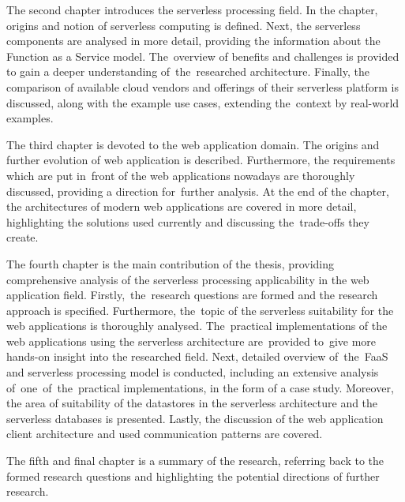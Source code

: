The second chapter introduces the serverless processing field.
In the chapter, origins and notion of serverless computing is defined.
Next, the serverless components are analysed in more detail, providing the information about the Function as a Service model.
The~overview of benefits and challenges is provided to gain a deeper understanding of~the~researched architecture.
Finally, the comparison of available cloud vendors and offerings of their serverless platform is discussed, along with the example use cases, extending the~context by real-world examples.

The third chapter is devoted to the web application domain. The origins and further evolution of web application is described.
Furthermore, the requirements which are put in~front of the web applications nowadays are thoroughly discussed, providing a direction for~further analysis.
At the end of the chapter, the architectures of modern web applications are covered in more detail, highlighting the solutions used currently and discussing the~trade-offs they create.

The fourth chapter is the main contribution of the thesis, providing comprehensive analysis of the serverless processing applicability in the web application field.
Firstly,~the~research questions are formed and the research approach is specified.
Furthermore, the~topic of the serverless suitability for the web applications is thoroughly analysed.
The~practical implementations of the web applications using the serverless architecture are~provided to~give more hands-on insight into the researched field.
Next, detailed overview of~the~FaaS and serverless processing model is conducted, including an extensive analysis of~one~of~the~practical implementations, in the form of a case study.
Moreover, the area of suitability of the datastores in the serverless architecture and the serverless databases is presented.
Lastly, the discussion of the web application client architecture and used communication patterns are covered.

The fifth and final chapter is a summary of the research, referring back to the formed research questions and highlighting the potential directions of further research.

